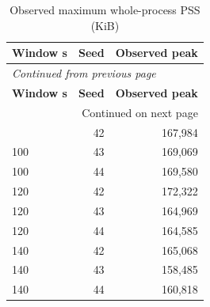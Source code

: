 \documentclass[10pt,a4paper]{article}
\begin{document}
\begin{longtable}{@{}lrr@{}}
\caption{Observed maximum whole-process PSS (KiB)}\\
\toprule
\textbf{Window s} & \textbf{Seed} & \textbf{Observed peak} \\
\midrule\endfirsthead
\multicolumn{3}{l}{\small\itshape Continued from previous page}\\
\toprule
\textbf{Window s} & \textbf{Seed} & \textbf{Observed peak} \\
\midrule\endhead
\midrule\multicolumn{3}{r}{\small Continued on next page}\\\endfoot
\bottomrule\endlastfoot
100 & 42 & 167,984 \\
100 & 43 & 169,069 \\
100 & 44 & 169,580 \\
120 & 42 & 172,322 \\
120 & 43 & 164,969 \\
120 & 44 & 164,585 \\
140 & 42 & 165,068 \\
140 & 43 & 158,485 \\
140 & 44 & 160,818 \\
\end{longtable}\endgroup
\end{document}
